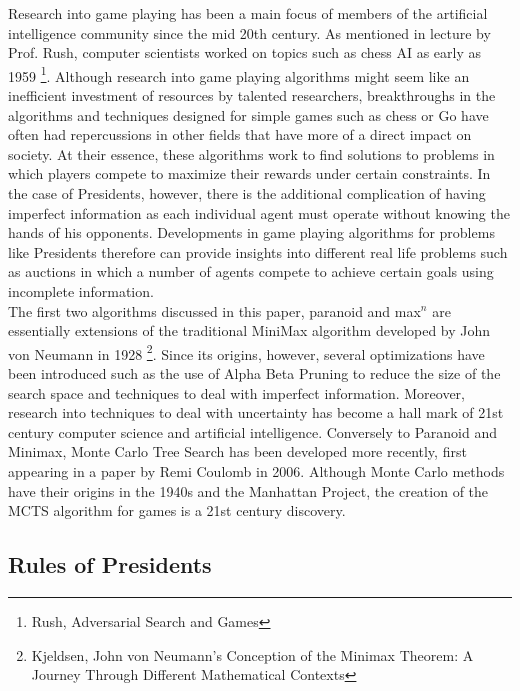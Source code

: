 \documentclass[11pt]{article}
\begin{document}
Research into game playing has been a main focus of members of the artificial intelligence community since the mid 20th century. As mentioned in lecture by Prof. Rush, computer scientists worked on topics such as chess AI as early as 1959 \footnote{Rush, Adversarial Search and Games}. Although research into game playing algorithms might seem like an inefficient investment of resources by talented researchers, breakthroughs in the algorithms and techniques designed for  simple games such as chess or Go have often had repercussions in other fields that have more of a direct impact on society. At their essence, these algorithms work to find solutions to problems in which players compete to maximize their rewards under certain constraints. In the case of Presidents, however, there is the additional complication of having imperfect information as each individual agent must operate without knowing the hands of his opponents. Developments in game playing algorithms for problems like Presidents therefore can provide insights into different real life problems such as auctions in which a number of agents compete to achieve certain goals using incomplete information.\\


The first two algorithms discussed in this paper, paranoid and max$^n$ are essentially extensions of the traditional MiniMax algorithm developed by John von Neumann in 1928 \footnote{Kjeldsen, John von Neumann's Conception of the Minimax Theorem: A Journey Through Different Mathematical Contexts}. Since its origins, however, several optimizations have been introduced such as the use of Alpha Beta Pruning to reduce the size of the search space and techniques to deal with imperfect information. Moreover, research into techniques to deal with uncertainty has become a hall mark of 21st century computer science and artificial intelligence. Conversely to Paranoid and Minimax, Monte Carlo Tree Search has been developed more recently, first appearing in a paper by Remi Coulomb in 2006. Although Monte Carlo methods have their origins in the 1940s and the Manhattan Project, the creation of the MCTS algorithm for games is a 21st century discovery.



\subsection{Rules of Presidents}
\end{document}
